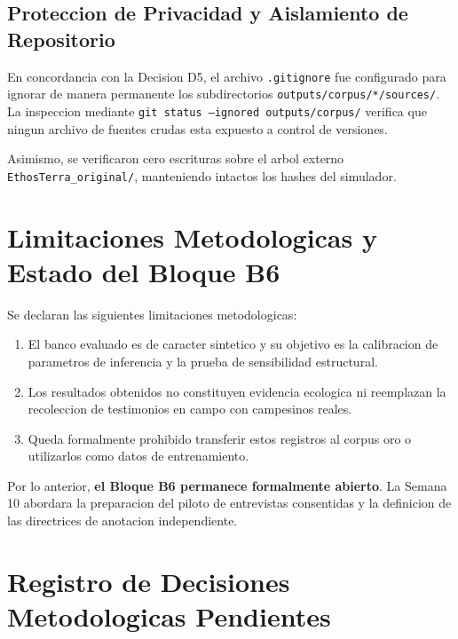 \documentclass[11pt,a4paper]{article}
\begin{document}
\subsection{Proteccion de Privacidad y Aislamiento de Repositorio}
En concordancia con la Decision D5, el archivo \texttt{.gitignore} fue configurado para ignorar de manera permanente los subdirectorios \texttt{outputs/corpus/*/sources/}. La inspeccion mediante \texttt{git status --ignored outputs/corpus/} verifica que ningun archivo de fuentes crudas esta expuesto a control de versiones.

Asimismo, se verificaron cero escrituras sobre el arbol externo \texttt{EthosTerra\_original/}, manteniendo intactos los hashes del simulador.

\section{Limitaciones Metodologicas y Estado del Bloque B6}

Se declaran las siguientes limitaciones metodologicas:
\begin{enumerate}[itemsep=2pt]
    \item El banco evaluado es de caracter sintetico y su objetivo es la calibracion de parametros de inferencia y la prueba de sensibilidad estructural.
    \item Los resultados obtenidos no constituyen evidencia ecologica ni reemplazan la recoleccion de testimonios en campo con campesinos reales.
    \item Queda formalmente prohibido transferir estos registros al corpus oro o utilizarlos como datos de entrenamiento.
\end{enumerate}

Por lo anterior, \textbf{el Bloque B6 permanece formalmente abierto}. La Semana 10 abordara la preparacion del piloto de entrevistas consentidas y la definicion de las directrices de anotacion independiente.

\section{Registro de Decisiones Metodologicas Pendientes}
\end{document}
